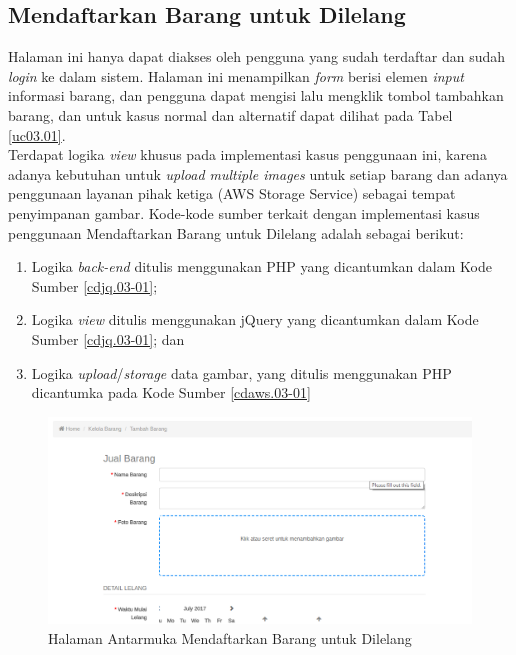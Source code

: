 \subsection{Mendaftarkan Barang untuk Dilelang}
\label{kasus-penggunaan-daftarbarang}
Halaman ini hanya dapat diakses oleh pengguna yang sudah terdaftar dan sudah \textit{login} ke dalam sistem. Halaman ini menampilkan \textit{form} berisi elemen \textit{input} informasi barang, dan pengguna dapat mengisi lalu mengklik tombol tambahkan barang, dan untuk kasus normal dan alternatif dapat dilihat pada Tabel \ref{uc03.01}.\\
\indent Terdapat logika \textit{view} khusus pada implementasi kasus penggunaan ini, karena adanya kebutuhan untuk \textit{upload multiple images} untuk setiap barang dan adanya penggunaan layanan pihak ketiga (AWS Storage Service) sebagai tempat penyimpanan gambar. Kode-kode sumber terkait dengan implementasi kasus penggunaan Mendaftarkan Barang untuk Dilelang adalah sebagai berikut:
	\begin{enumerate}
		\item Logika \textit{back-end} ditulis menggunakan PHP yang dicantumkan dalam Kode Sumber \ref{cdjq.03-01}; 
		\item Logika \textit{view} ditulis menggunakan jQuery yang dicantumkan dalam Kode Sumber \ref{cdjq.03-01}; dan
		\item Logika \textit{upload}/\textit{storage} data gambar, yang ditulis menggunakan PHP dicantumka pada Kode Sumber \ref{cdaws.03-01}
	\end{enumerate} 

  \begin{figure}[H]
    \centering
    \includegraphics[width=\textwidth]{images/bab4/ui/03-01.png}
    \caption{Halaman Antarmuka Mendaftarkan Barang untuk Dilelang}
    \label{ui.03-01}
  \end{figure}

